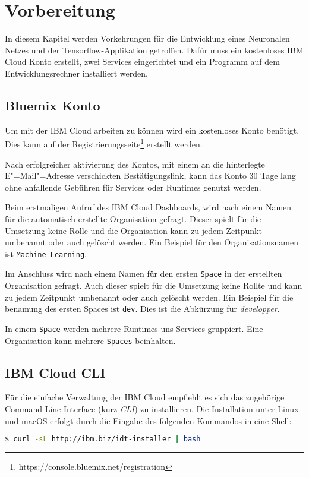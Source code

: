 \section{Vorbereitung}
In diesem Kapitel werden Vorkehrungen für die Entwicklung eines Neuronalen Netzes und der Tensorflow-Applikation
getroffen. Dafür muss ein kostenloses IBM Cloud Konto erstellt, zwei Services eingerichtet und ein Programm auf dem
Entwicklungsrechner installiert werden.

\subsection{Bluemix Konto}
Um mit der IBM Cloud arbeiten zu können wird ein kostenloses Konto benötigt. Dies kann auf der
Registrierungsseite\footnote{https://console.bluemix.net/registration} erstellt werden.

Nach erfolgreicher aktivierung des Kontos, mit einem an die hinterlegte E"=Mail"=Adresse verschickten Bestätigungslink,
kann das Konto 30 Tage lang ohne anfallende Gebühren für Services oder Runtimes genutzt werden.

Beim erstmaligen Aufruf des IBM Cloud Dashboards, wird nach einem Namen für die automatisch erstellte Organisation gefragt.
Dieser spielt für die Umsetzung keine Rolle und die Organisation kann zu jedem Zeitpunkt umbenannt oder auch gelöscht werden.
Ein Beispiel für den Organisationsnamen ist \texttt{Machine-Learning}.

Im Anschluss wird nach einem Namen für den ersten \texttt{Space} in der erstellten Organisation gefragt. Auch dieser spielt
für die Umsetzung keine Rollte und kann zu jedem Zeitpunkt umbenannt oder auch gelöscht werden. Ein Beispiel für die
benamung des ersten Spaces ist \texttt{dev}. Dies ist die Abkürzung für \textit{developper}.

In einem \texttt{Space} werden mehrere Runtimes uns Services gruppiert. Eine Organisation kann mehrere \texttt{Spaces} beinhalten.

\subsection{IBM Cloud CLI}
Für die einfache Verwaltung der IBM Cloud empfiehlt es sich das zugehörige Command Line Interface (kurz \textit{CLI}) zu
installieren. Die Installation unter Linux und macOS erfolgt durch die Eingabe des folgenden Kommandos in eine Shell:

\begin{lstlisting}[language=bash, caption=Installation des IBM Cloud CLI, label=Installation des IBM Cloud CLI]
    $ curl -sL http://ibm.biz/idt-installer | bash
\end{lstlisting}

